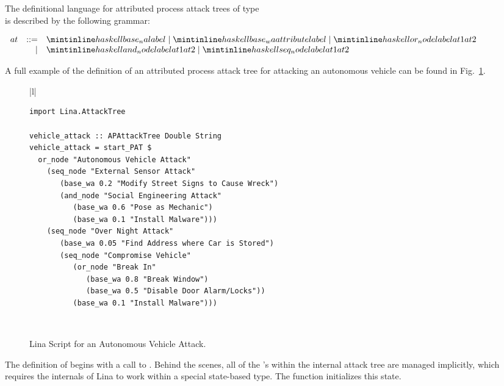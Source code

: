 \documentclass{llncs}
\begin{document}
The definitional language for attributed process attack trees of type \\
 is described by the following
grammar:
\begin{center}
  \footnotesize
  \begin{math}
    \begin{array}{lrlll}
      at & ::=  & \mh{base_na label} \mid \mh{base_wa attribute label} \mid \mh{or_node label at1 at2} \\
      & \mid & \mh{and_node label at1 at2} \mid \mh{seq_node label at1 at2}\\
    \end{array}
  \end{math}
\end{center}
A full example of the definition of an attributed process attack tree
for attacking an autonomous vehicle can be found in
Fig.~\ref{fig:vehicle_attack}. 
\begin{figure}
      \begin{tabular}{|l|}
        \hline\\[-7px]
      \begin{minipage}{\textwidth}
        \begin{verbatim}
import Lina.AttackTree

vehicle_attack :: APAttackTree Double String
vehicle_attack = start_PAT $
  or_node "Autonomous Vehicle Attack"
    (seq_node "External Sensor Attack"
       (base_wa 0.2 "Modify Street Signs to Cause Wreck")
       (and_node "Social Engineering Attack"
          (base_wa 0.6 "Pose as Mechanic")
          (base_wa 0.1 "Install Malware")))
    (seq_node "Over Night Attack"
       (base_wa 0.05 "Find Address where Car is Stored")
       (seq_node "Compromise Vehicle"
          (or_node "Break In"
             (base_wa 0.8 "Break Window")
             (base_wa 0.5 "Disable Door Alarm/Locks"))
          (base_wa 0.1 "Install Malware")))
        \end{verbatim}
        \vspace{2px}
      \end{minipage} \\
      \hline
    \end{tabular}
  \caption{Lina Script for an Autonomous Vehicle Attack.}
  \label{fig:vehicle_attack}
\end{figure}
The definition of  begins with a call to
.  Behind the scenes, all of the 's within the
internal attack tree are managed implicitly, which requires the
internals of Lina to work within a special state-based type.  The
function  initializes this state.
\end{document}
